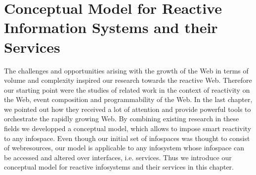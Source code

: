 



\chapter{Conceptual Model for Reactive Information Systems and their Services}
The challenges and opportunities arising with the growth of the Web in terms of volume and complexity inspired our research towards the reactive Web.
Therefore our starting point were the studies of related work in the context of reactivity on the Web, event composition and programmability of the Web.
In the last chapter, we pointed out how they received a lot of attention and provide powerful tools to orchestrate the rapidly growing Web.
By combining existing research in these fields we developped a conceptual model, which allows to impose smart reactivity to any \textrm{\gls{infospace}}.
Even though our initial set of \textrm{\glspl{infospace}} was thought to consist of \textrm{\glspl{webresource}}, our model is applicable to any \textrm{\gls{infosystem}} whose \textrm{\gls{infospace}} can be accessed and altered over interfaces, i.e. services.
Thus we introduce our conceptual model for reactive \textrm{\glspl{infosystem}} and their services in this chapter.

